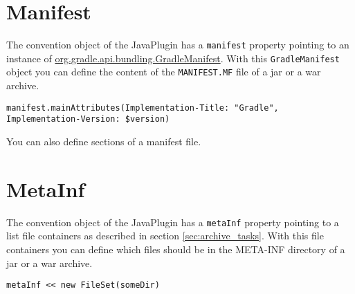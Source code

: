 \section{Manifest} %
\label{sec:manifest}
The convention object of the JavaPlugin has a \texttt{manifest} property pointing to an instance of \href{\API tasks/bundling/GradleManifest.html}{org.gradle.api.bundling.GradleManifest}. With this \texttt{GradleManifest} object you can define the content of the \texttt{MANIFEST.MF} file of a jar or a war archive. 
\begin{Verbatim}
manifest.mainAttributes(Implementation-Title: "Gradle", Implementation-Version: $version)
\end{Verbatim}
You can also define sections of a manifest file.

\section{MetaInf} %
\label{sec:metainf}
The convention object of the JavaPlugin has a \texttt{metaInf} property pointing to a list file containers as described in section \ref{sec:archive_tasks}. With this file containers you can define which files should be in the META-INF directory of a jar or a war archive. 
\begin{Verbatim}
metaInf << new FileSet(someDir)
\end{Verbatim}
